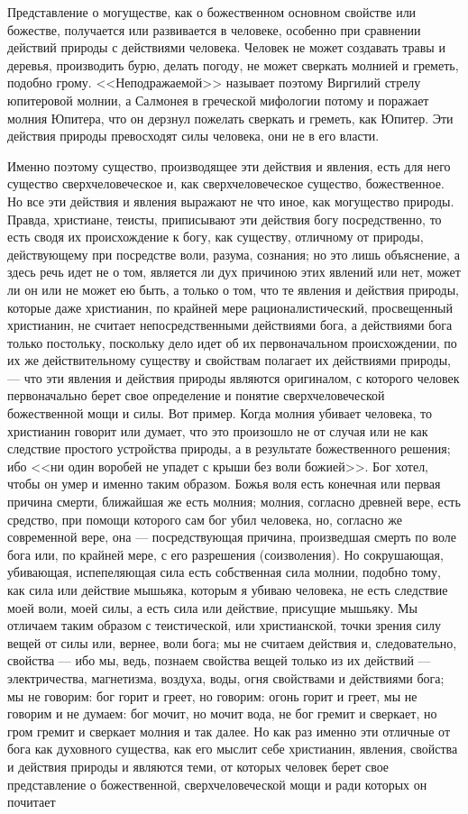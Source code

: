 \documentclass[12pt]{article}
\begin{document}
Представление о могуществе, как о божественном основном свойстве или божестве, получается или развивается в человеке, особенно при сравнении действий природы с действиями человека. Человек не может создавать травы и деревья, производить бурю, делать погоду, не может сверкать молнией и греметь, подобно грому. <<Неподражаемой>> называет поэтому Виргилий стрелу юпитеровой молнии, а Салмонея в греческой мифологии потому и поражает молния Юпитера, что он дерзнул пожелать сверкать и греметь, как Юпитер. Эти действия природы превосходят силы человека, они не в его власти. 

Именно поэтому существо, производящее эти действия и явления, есть для него существо сверхчеловеческое и, как сверхчеловеческое существо, божественное. Но все эти действия и явления выражают не что иное, как могущество природы. Правда, христиане, теисты, приписывают эти действия богу посредственно, то есть сводя их происхождение к богу, как существу, отличному от природы, действующему при посредстве воли, разума, сознания; но это лишь объяснение, а здесь речь идет не о том, является ли дух причиною этих явлений или нет, может ли он или не может ею быть, а только о том, что те явления и действия природы, которые даже христианин, по крайней мере рационалистический, просвещенный христианин, не считает непосредственными действиями бога, а действиями бога только постольку, поскольку дело идет об их первоначальном происхождении, по их же действительному существу и свойствам полагает их действиями природы, --- что эти явления и действия природы являются оригиналом, с которого человек первоначально берет свое определение и понятие сверхчеловеческой божественной мощи и силы. Вот пример. Когда молния убивает человека, то христианин говорит или думает, что это произошло не от случая или не как следствие простого устройства природы, а в результате божественного решения; ибо <<ни один воробей не упадет с крыши без воли божией>>. Бог хотел, чтобы он умер и именно таким образом. Божья воля есть конечная или первая причина смерти, ближайшая же есть молния; молния, согласно древней вере, есть средство, при помощи которого сам бог убил человека, но, согласно же современной вере, она --- посредствующая причина, произведшая смерть по воле бога или, по крайней мере, с его разрешения (соизволения). Но сокрушающая, убивающая, испепеляющая сила есть собственная сила молнии, подобно тому, как сила или действие мышьяка, которым я убиваю человека, не есть следствие моей воли, моей силы, а есть сила или действие, присущие мышьяку. Мы отличаем таким образом с теистической, или христианской, точки зрения силу вещей от силы или, вернее, воли бога; мы не считаем действия и, следовательно, свойства --- ибо мы, ведь, познаем свойства вещей только из их действий --- электричества, магнетизма, воздуха, воды, огня свойствами и действиями бога; мы не говорим: бог горит и греет, но говорим: огонь горит и греет, мы не говорим и не думаем: бог мочит, но мочит вода, не бог гремит и сверкает, но гром гремит и сверкает молния и так далее. Но как раз именно эти отличные от бога как духовного существа, как его мыслит себе христианин, явления, свойства и действия природы и являются теми, от которых человек берет свое представление о божественной, сверхчеловеческой мощи и ради которых он почитает 
\end{document}
